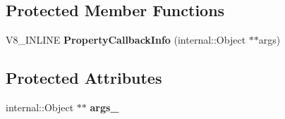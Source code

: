 \subsection*{Protected Member Functions}
\begin{DoxyCompactItemize}
\item 
\mbox{\label{classv8_1_1PropertyCallbackInfo_aa666043c86d4db9a57a3ac866c78ee0e}} 
V8\+\_\+\+I\+N\+L\+I\+NE {\bfseries Property\+Callback\+Info} (internal\+::\+Object $\ast$$\ast$args)
\end{DoxyCompactItemize}
\subsection*{Protected Attributes}
\begin{DoxyCompactItemize}
\item 
\mbox{\label{classv8_1_1PropertyCallbackInfo_a57b2243627071c62ed3900a741a41a0b}} 
internal\+::\+Object $\ast$$\ast$ {\bfseries args\+\_\+}
\end{DoxyCompactItemize}
